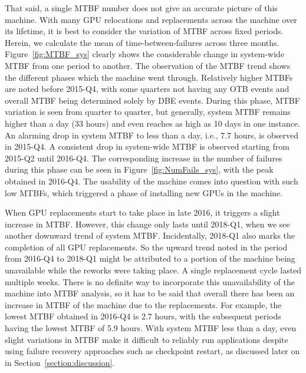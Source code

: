 That said, a single MTBF number does not give an accurate picture of this machine.
With many GPU relocations and replacements across the machine over its lifetime, it is 
best to consider the variation of MTBF across fixed periods. Herein, we calculate 
the mean of time-between-failures across three months. Figure~\ref{fig:MTBF_sys}
clearly shows the considerable change in system-wide MTBF from one period to another. 
The observation of the MTBF trend shows the different phases which the machine went through. 
Relatively higher MTBFs are noted before 2015-Q4, with some quarters not having any OTB events 
and overall MTBF being determined solely by DBE events. During this phase, MTBF variation is seen
from quarter to quarter, but generally, system MTBF remains higher than a day (33 hours) and even reaches as high
as 10 days in one instance. An alarming drop in system MTBF to less than a day, i.e., 7.7 hours, is observed in 2015-Q4.
A consistent drop in system-wide MTBF is observed starting from 2015-Q2 until 2016-Q4. 
The corresponding increase in the number of failures during this phase can be seen in Figure~\ref{fig:NumFails_sys},
with the peak obtained in 2016-Q4. The usability of the machine comes into question with such low MTBFs, which triggered 
a phase of installing new GPUs in the machine.

When GPU replacements start to take place in late 
2016, it triggers a slight increase in MTBF. However, this change only lasts until 2018-Q1, when we see another 
downward trend of system MTBF. Incidentally, 2018-Q1 also marks the completion of all GPU replacements. 
So the upward trend noted in the period from 2016-Q4 to 2018-Q1 might be attributed to a portion of the machine 
being unavailable while the reworks were taking place. A single replacement cycle lasted multiple weeks. 
There is no definite way to incorporate this unavailability of the machine into MTBF analysis, so it has to
be said that overall there has been an increase in MTBF of the machine due to the replacements. 
For example, the lowest MTBF obtained in 2016-Q4 is 2.7 hours, with the subsequent periods having the 
lowest MTBF of 5.9 hours. With system MTBF less than a day, even slight variations in MTBF make it 
difficult to reliably run applications despite using failure recovery approaches such as checkpoint restart, 
as discussed later on in Section~\ref{section:discussion}. 


